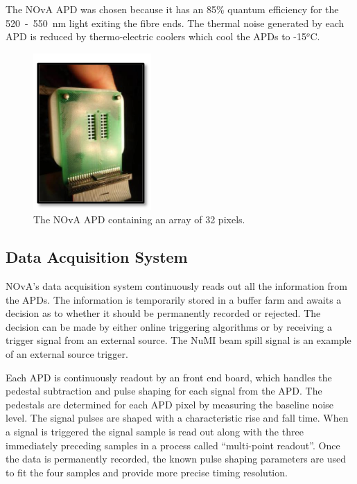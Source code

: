 The NOvA APD was chosen because it has an 85\% quantum efficiency for
the 520~-~550~nm light exiting the fibre ends. 
The thermal noise generated by each APD is reduced by thermo-electric
coolers which cool the APDs to -15$^o$C. 


\begin{figure}
  \centering
  \includegraphics[width=0.4\textwidth]{../../img/det/gen/APD.png}
  \caption{The NOvA APD containing an array of 32 pixels.}
  \label{fig:apd}
\end{figure}





\subsection{Data Acquisition System}

NOvA's data acquisition system continuously reads out all
the information from the APDs. The information is temporarily stored
in a buffer farm and awaits a decision as to whether it should be
permanently recorded or rejected. The decision can be made by either
online triggering algorithms or by receiving a trigger signal from an
external source. The NuMI beam spill signal is an example of an
external source trigger.


Each APD is continuously readout by an front end board, which handles the pedestal
subtraction and
pulse shaping for each signal from the APD. The pedestals are
determined for each APD pixel by measuring the baseline noise level.
The signal pulses are shaped with a characteristic rise and fall
time. When a signal is triggered the signal sample is read out along
with the three immediately preceding samples in a process called
``multi-point readout''. Once the data is permanently recorded, the
known pulse shaping 
parameters are used to fit the four samples and provide more
precise timing resolution. 

